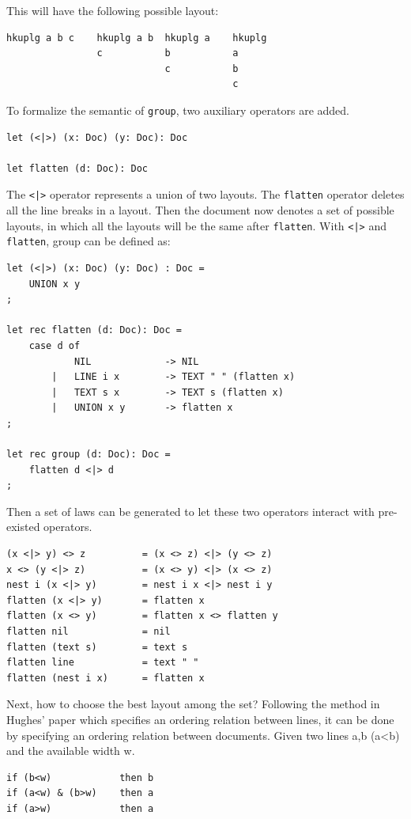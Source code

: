 This will have the following possible layout:
\begin{lstlisting}[language=Haskell]
hkuplg a b c    hkuplg a b  hkuplg a    hkuplg
                c           b           a
                            c           b
                                        c
\end{lstlisting}

To formalize the semantic of \texttt{group}, two auxiliary operators are added.
\begin{lstlisting}
let (<|>) (x: Doc) (y: Doc): Doc

let flatten (d: Doc): Doc
\end{lstlisting}

The \texttt{<|>} operator represents a union of two layouts. The \texttt{flatten} operator deletes all the line breaks in a layout. Then the document now denotes a set of possible layouts, in which all the layouts will be the same after \texttt{flatten}. With \texttt{<|>} and \texttt{flatten}, group can be defined as:
\begin{lstlisting}
let (<|>) (x: Doc) (y: Doc) : Doc =
    UNION x y
;

let rec flatten (d: Doc): Doc =
    case d of
            NIL             -> NIL
        |   LINE i x        -> TEXT " " (flatten x)
        |   TEXT s x        -> TEXT s (flatten x)
        |   UNION x y       -> flatten x
;

let rec group (d: Doc): Doc =
    flatten d <|> d
;
\end{lstlisting}

Then a set of laws can be generated to let these two operators interact with pre-existed operators.
\begin{lstlisting}
(x <|> y) <> z          = (x <> z) <|> (y <> z)
x <> (y <|> z)          = (x <> y) <|> (x <> z)
nest i (x <|> y)        = nest i x <|> nest i y
flatten (x <|> y)       = flatten x
flatten (x <> y)        = flatten x <> flatten y
flatten nil             = nil
flatten (text s)        = text s
flatten line            = text " "
flatten (nest i x)      = flatten x
\end{lstlisting}

Next, how to choose the best layout among the set? Following the method in Hughes' paper\cite{hughes1995design} which specifies an ordering relation between lines, it can be done by specifying an ordering relation between documents. Given two lines a,b (a<b) and the available width w.
\begin{lstlisting}
if (b<w)            then b
if (a<w) & (b>w)    then a
if (a>w)            then a
\end{lstlisting}

